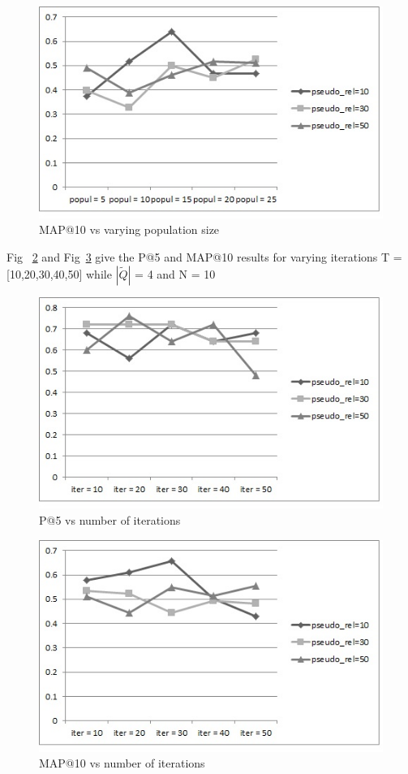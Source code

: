 \documentclass{nitk}
\begin{document}
 \begin{figure}[!htb]
 \centering
 \includegraphics[scale=0.5]{population_map_10}
 \caption{MAP@10 vs varying population size}
 \label{fig:pop_map}
\end{figure}
Fig ~\ref{fig:iter_p} and Fig~\ref{fig:iter_map} give the P@5 and MAP@10 results for varying iterations T =[10,20,30,40,50] while $|\tilde{Q}|$ = 4 and N = 10
\begin{figure}[!htb]
\centering
 \includegraphics[scale=0.5]{iteration_p_5}
 \caption{P@5 vs number of iterations}
 \label{fig:iter_p}
 \end{figure}
 \begin{figure}[!htb]
 \centering
 \includegraphics[scale=0.5]{iteration_map_10}
 \caption{MAP@10 vs number of iterations}
 \label{fig:iter_map}
\end{figure}
\end{document}
